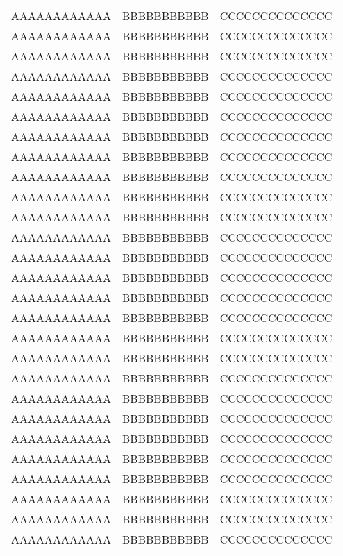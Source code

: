 \begin{longtable}{ccc}
AAAAAAAAAAAA   &   BBBBBBBBBBB   &   CCCCCCCCCCCCCC   \\
AAAAAAAAAAAA   &   BBBBBBBBBBB   &   CCCCCCCCCCCCCC   \\
AAAAAAAAAAAA   &   BBBBBBBBBBB   &   CCCCCCCCCCCCCC   \\
AAAAAAAAAAAA   &   BBBBBBBBBBB   &   CCCCCCCCCCCCCC   \\
AAAAAAAAAAAA   &   BBBBBBBBBBB   &   CCCCCCCCCCCCCC   \\
AAAAAAAAAAAA   &   BBBBBBBBBBB   &   CCCCCCCCCCCCCC   \\
AAAAAAAAAAAA   &   BBBBBBBBBBB   &   CCCCCCCCCCCCCC   \\
AAAAAAAAAAAA   &   BBBBBBBBBBB   &   CCCCCCCCCCCCCC   \\
AAAAAAAAAAAA   &   BBBBBBBBBBB   &   CCCCCCCCCCCCCC   \\
AAAAAAAAAAAA   &   BBBBBBBBBBB   &   CCCCCCCCCCCCCC   \\
AAAAAAAAAAAA   &   BBBBBBBBBBB   &   CCCCCCCCCCCCCC   \\
AAAAAAAAAAAA   &   BBBBBBBBBBB   &   CCCCCCCCCCCCCC   \\
AAAAAAAAAAAA   &   BBBBBBBBBBB   &   CCCCCCCCCCCCCC   \\
AAAAAAAAAAAA   &   BBBBBBBBBBB   &   CCCCCCCCCCCCCC   \\
AAAAAAAAAAAA   &   BBBBBBBBBBB   &   CCCCCCCCCCCCCC   \\
AAAAAAAAAAAA   &   BBBBBBBBBBB   &   CCCCCCCCCCCCCC   \\
AAAAAAAAAAAA   &   BBBBBBBBBBB   &   CCCCCCCCCCCCCC   \\
AAAAAAAAAAAA   &   BBBBBBBBBBB   &   CCCCCCCCCCCCCC   \\
AAAAAAAAAAAA   &   BBBBBBBBBBB   &   CCCCCCCCCCCCCC   \\
AAAAAAAAAAAA   &   BBBBBBBBBBB   &   CCCCCCCCCCCCCC   \\
AAAAAAAAAAAA   &   BBBBBBBBBBB   &   CCCCCCCCCCCCCC   \\
AAAAAAAAAAAA   &   BBBBBBBBBBB   &   CCCCCCCCCCCCCC   \\
AAAAAAAAAAAA   &   BBBBBBBBBBB   &   CCCCCCCCCCCCCC   \\
AAAAAAAAAAAA   &   BBBBBBBBBBB   &   CCCCCCCCCCCCCC   \\
AAAAAAAAAAAA   &   BBBBBBBBBBB   &   CCCCCCCCCCCCCC   \\
AAAAAAAAAAAA   &   BBBBBBBBBBB   &   CCCCCCCCCCCCCC   \\
AAAAAAAAAAAA   &   BBBBBBBBBBB   &   CCCCCCCCCCCCCC   \\

\end{longtable}
